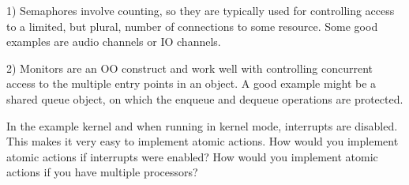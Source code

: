 1) Semaphores involve counting, so they are typically used for 
controlling
   access to a limited, but plural, number of connections to some 
resource.
   Some good examples are audio channels or IO channels.

2) Monitors are an OO construct and work well with controlling 
concurrent
   access to the multiple entry points in an object. A good example 
might
   be a shared queue object, on which the enqueue and dequeue operations
   are protected.



 In the example kernel and when running in kernel mode, interrupts are disabled. This
makes it very easy to implement atomic actions. How would you implement atomic
actions if interrupts were enabled? How would you implement atomic actions if you
have multiple processors?
